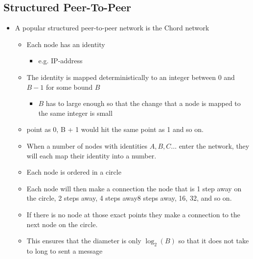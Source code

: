 \documentclass[11pt]{article}
\begin{document}
\subsection{Structured Peer-To-Peer}
\label{sec:org0f5757b}
\begin{itemize}
\item A popular structured peer-to-peer network is the Chord network
\begin{itemize}
\item Each node has an identity
\begin{itemize}
\item e.g. IP-address
\end{itemize}
\item The identity is mapped deterministically to an integer between \(0\) and \(B-1\) for some bound \(B\)
\begin{itemize}
\item \(B\) has to large enough so that the change that a node is mapped to the same integer is small
\end{itemize}
\item point as 0, B + 1 would hit the same point as 1 and so on.
\item When a number of nodes with identities \(A, B, C \dots\) enter the network, they will each map their identity into a number.
\item Each node is ordered in a circle
\item Each node will then make a connection the node that is 1 step away on the circle, 2 steps away, 4 steps away8 steps away, 16, 32, and so on.
\item If there is no node at those exact points they make a connection to the next node on the circle.
\item This ensures that the diameter is only \(\log_2(B)\) so that it does not take to long to sent a message
\end{itemize}
\end{itemize}
\end{document}
